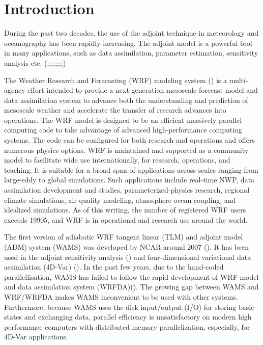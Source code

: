 \documentclass[12pt]{article}
\begin{document}
\section{Introduction}

During the past two decades, the use of the adjoint technique in meteorology and oceanography has been rapidly increasing.  The adjoint model is a powerful tool in many applications, such as data assimilation, parameter estimation, sensitivity analysis etc. (\cite{Errico1992};\cite{Errico1997};\cite{Rabier1996};\cite{Langland1999};\cite{Li1999};\cite{Xiao2002};\cite{Xiao2008};\cite{Kleist2005a};\cite{Kleist2005b})

The Weather Research and Forecasting (WRF) modeling system (\cite{Skamarock2005}) is a multi-agency effort intended to provide a next-generation mesoscale forecast model and data assimilation system to advance both the understanding and prediction of mesoscale weather and accelerate the transfer of research advances into operations. The WRF model is designed to be an efficient massively parallel computing code to take advantage of advanced high-performance computing systems. The code can be configured for both research and operations and offers numerous physics options. WRF is maintained and supported as a community model to facilitate wide use internationally, for research, operations, and teaching. It is suitable for a broad span of applications across scales ranging from large-eddy to global simulations. Such applications include real-time NWP, data assimilation development and studies, parameterized-physics research, regional climate simulations, air quality modeling, atmosphere-ocean coupling, and idealized simulations. As of this writing, the number of registered WRF users exceeds 19905, and WRF is in operational and research use around the world.

The first version of adiabatic WRF tangent linear (TLM) and adjoint model (ADM) system (WAMS) was developed by NCAR around 2007 (\cite{Xiao2008}). It has been used in the adjoint sensitivity analysis (\cite{Xiao2008}) and four-dimensional variational data assimilation (4D-Var) (\cite{Huang2009}). In the past few years, due to the hand-coded parallellisation, WAMS has failed to follow the rapid development of WRF model and data assimilation system (WRFDA)(\cite{Barker2012}). The growing gap between WAMS and WRF/WRFDA makes WAMS inconvenient to be used with other systems. Furthermore, because WAMS uses the disk input/output (I/O) for storing basic states and exchanging data, parallel efficiency is unsatisfactory on modern high performance computers with distributed memory parallelization, especially, for 4D-Var applications.  
 
\end{document}
